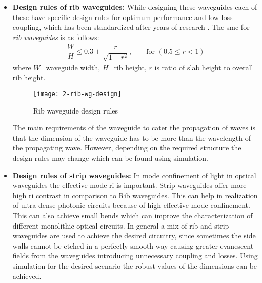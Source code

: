 \documentclass[../report.tex]{subfiles}
\begin{document}
\begin{itemize}	
	\item \textbf{Design rules of rib waveguides:} While designing these waveguides each of these have specific design rules for optimum performance and low-loss coupling, which has been standardized after years of research \cite{reed_silicon_2008}. The \gls{smc} for \textit{rib waveguides} is as follows:	
	\begin{equation}\label{eq:smc_rib_wg}
	\begin{aligned}
	\dfrac {W} {H}\leq 0.3+\dfrac {r} {\sqrt {1-r^{2}}},  && \text{ for } (0.5 \leq r < 1)
	\end{aligned}
	\end{equation}
	where $W$=waveguide width, $H$=rib height, $r$ is ratio of slab height to overall rib height.
	\begin{figure}[H] %
		\centering
		\texttt{[image: 2-rib-wg-design]}
		\caption{Rib waveguide design rules}
		\label{fig:2_rib_wg_design}
	\end{figure}
The main requirements of the waveguide to cater the propagation of waves is that the dimension of the waveguide has to be more than the wavelength of the propagating wave. However, depending on the required structure the design rules may change which can be found using simulation. 
	
\item \textbf{Design rules of strip waveguides:} In mode confinement of light in optical waveguides the effective mode \gls{ri} is important. Strip waveguides offer more high \gls{ri} contrast in comparison to Rib waveguides. This can help in realization of ultra-dense photonic circuits because of high effective mode confinement. This can also achieve small bends which can improve the characterization of different monolithic optical circuits. In general a mix of rib and strip waveguides are used to achieve the desired circuitry, since sometimes the side walls cannot be etched in a perfectly smooth way causing greater evanescent fields from the waveguides introducing unnecessary coupling and losses. Using simulation for the desired scenario the robust values of the dimensions can be achieved.
\end{itemize}
		
\end{document}
